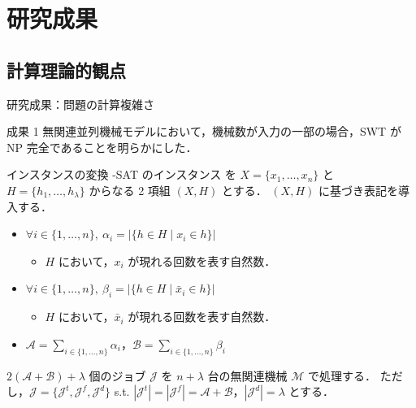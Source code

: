 \documentclass[dvipdfmx]{beamer}
\begin{document}
    \section{研究成果}
    \subsection{計算理論的観点}
    \begin{frame}{研究成果：問題の計算複雑さ}
      \begin{alertblock}{成果 1}
        無関連並列機械モデルにおいて，機械数が入力の一部の場合，SWT が NP 完全であることを明らかにした．
      \end{alertblock}
      \begin{block}{インスタンスの変換}
        {-SAT} のインスタンス を $X = \{x_1,\ldots,x_n\}$ と $H = \{h_1,\ldots,h_{\lambda}\}$ からなる 2 項組 $(X,H)$ とする．
        $(X,H)$ に基づき表記を導入する．
        \begin{itemize}
          \item $\forall i \in \{1,\ldots,n\},~\alpha_i = |\{h \in H \mid x_i \in h\}|$
          \begin{itemize}
            \item $H$ において，$x_i$ が現れる回数を表す自然数．
          \end{itemize}
          \item $\forall i \in \{1,\ldots,n\},~\beta_i = |\{h \in H \mid \bar x_i \in h\}|$
          \begin{itemize}
            \item $H$ において，$\bar x_i$ が現れる回数を表す自然数．
          \end{itemize}
          \item $\mathcal{A} = {\displaystyle \sum_{i \in \{1,\ldots,n\}}\alpha_i}$，$\mathcal{B} = {\displaystyle \sum_{i \in \{1,\ldots,n\}}\beta_i}$
        \end{itemize}
      \end{block}
      $2(\mathcal{A} + \mathcal{B}) + \lambda$ 個のジョブ $\mathcal{J}$ を $n + \lambda$ 台の無関連機械 $\mathcal{M}$ で処理する．
      ただし，$\mathcal{J} = \{\mathcal{J}^t,\mathcal{J}^f,\mathcal{J}^d\}$ s.t. $|\mathcal{J}^t| = |\mathcal{J}^f| = \mathcal{A} + \mathcal{B}$，$|\mathcal{J}^d| = \lambda$ とする．
    \end{frame}
\end{document}
